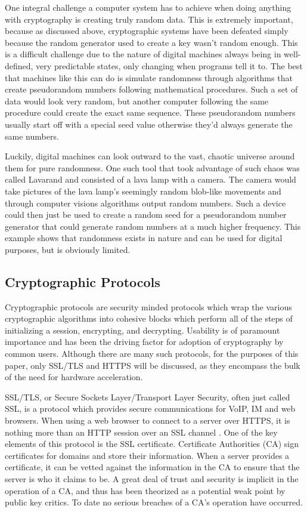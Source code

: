 \documentclass[journal]{IEEEtran}
\begin{document}
One integral challenge a computer system has to achieve when doing anything with cryptography is creating truly random data.  This is extremely important, because as discussed above, cryptographic systems have been defeated simply because the random generator used to create a key wasn't random enough.  This is a difficult challenge due to the nature of digital machines always being in well-defined, very predictable states, only changing when programs tell it to.  The best that machines like this can do is simulate randomness through algorithms that create pseudorandom numbers following mathematical procedures.  Such a set of data would look very random, but another computer following the same procedure could create the exact same sequence.  These pseudorandom numbers usually start off with a special seed value otherwise they'd always generate the same numbers.

Luckily, digital machines can look outward to the vast, chaotic universe around them for pure randomness.  One such tool that took advantage of such chaos was called Lavarand and consisted of a lava lamp with a camera.  The camera would take pictures of the lava lamp's seemingly random blob-like movements and through computer visions algorithms output random numbers.  Such a device could then just be used to create a random seed for a pseudorandom number generator that could generate random numbers at a much higher frequency.  This example shows that randomness exists in nature and can be used for digital purposes, but is obviously limited.  

\subsection{Cryptographic Protocols}

Cryptographic protocols are security minded protocols which wrap the various cryptographic algorithms into cohesive blocks which perform all of the steps of initializing a session, encrypting, and decrypting.  Usability is of paramount importance and has been the driving factor for adoption of cryptography by common users.  Although there are many such protocols, for the purposes of this paper, only SSL/TLS and HTTPS will be discussed, as they encompass the bulk of the need for hardware acceleration.

SSL/TLS, or Secure Sockets Layer/Transport Layer Security, often just called SSL, is a protocol which provides secure communications for VoIP, IM and web browsers.  When using a web browser to connect to a server over HTTPS, it is nothing more than an HTTP session over an SSL channel \cite{howSSLWorks}.  One of the key elements of this protocol is the SSL certificate.  Certificate Authorities (CA) sign certificates for domains and store their information.  When a server provides a certificate, it can be vetted against the information in the CA to ensure that the server is who it claims to be.  A great deal of trust and security is implicit in the operation of a CA, and thus has been theorized as a potential weak point by public key critics.  To date no serious breaches of a CA's operation have occurred.
\end{document}
